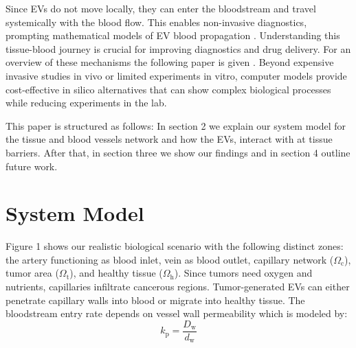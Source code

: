 \documentclass[sigconf]{acmart}
\begin{document}
Since EVs do not move locally, they can enter the bloodstream and travel systemically with the blood flow. This enables non-invasive diagnostics, prompting mathematical models of EV blood propagation \cite{Ferguson_2020}. Understanding this tissue-blood journey is crucial for improving diagnostics and drug delivery. For an overview of these mechanisms the following paper is given \cite{Sykov__2008}. Beyond expensive invasive studies in vivo or limited experiments in vitro, computer models provide cost-effective in silico alternatives that can show complex biological processes while reducing experiments in the lab. 

This paper is structured as follows: In section 2 we explain our system model for the tissue and blood vessels network and how the EVs, interact with at tissue barriers. After that, in section three we show our findings and in section 4 outline future work.

\section{System Model}
\label{subsec: sys-model}
Figure 1 shows our realistic biological scenario with the following distinct zones: the artery functioning as blood inlet, vein as blood outlet, capillary network ($\Omega_{\text{c}}$), tumor area ($\Omega_{\text{t}}$), and healthy tissue ($\Omega_{\text{h}}$). Since tumors need oxygen and nutrients, capillaries infiltrate cancerous regions. Tumor-generated EVs can either penetrate capillary walls into blood or migrate into healthy tissue. The bloodstream entry rate depends on vessel wall permeability which is modeled by:
\begin{displaymath}
  k_{\mathrm{p}}=\frac{D_{\mathrm{w}}}{d_{\mathrm{w}}}
\end{displaymath}
\end{document}
